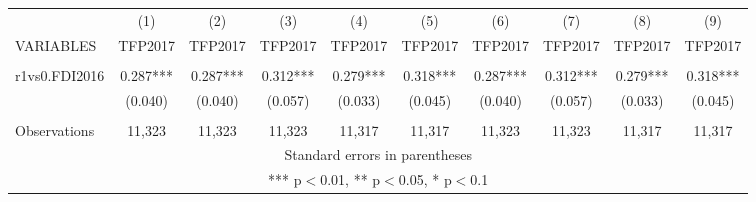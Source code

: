 \documentclass[]{article}
\begin{document}
\begin{tabular}{lccccccccc} \hline
 & (1) & (2) & (3) & (4) & (5) & (6) & (7) & (8) & (9) \\
VARIABLES & TFP2017 & TFP2017 & TFP2017 & TFP2017 & TFP2017 & TFP2017 & TFP2017 & TFP2017 & TFP2017 \\ \hline
 &  &  &  &  &  &  &  &  &  \\
r1vs0.FDI2016 & 0.287*** & 0.287*** & 0.312*** & 0.279*** & 0.318*** & 0.287*** & 0.312*** & 0.279*** & 0.318*** \\
 & (0.040) & (0.040) & (0.057) & (0.033) & (0.045) & (0.040) & (0.057) & (0.033) & (0.045) \\
 &  &  &  &  &  &  &  &  &  \\
 Observations & 11,323 & 11,323 & 11,323 & 11,317 & 11,317 & 11,323 & 11,323 & 11,317 & 11,317 \\ \hline
\multicolumn{10}{c}{ Standard errors in parentheses} \\
\multicolumn{10}{c}{ *** p$<$0.01, ** p$<$0.05, * p$<$0.1} \\
\end{tabular}
\end{document}
